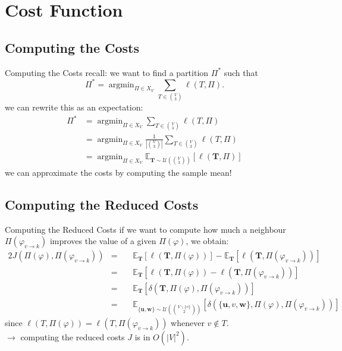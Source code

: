 \documentclass[10pt]{beamer}
\newcommand{\wf}{\mathbf{w}}
\newcommand{\uf}{\mathbf{u}}
\newcommand{\Tf}{\mathbf{T}}
\newcommand{\Uc}{\mathcal{U}}
\newcommand{\E}{\mathbb{E}}
\newcommand{\idx}{\varphi}
\newcommand{\move}[3]{#1_{#2\rightarrow #3}}
\DeclareMathOperator*{\argmin}{\arg\min}
\begin{document}
\section{Cost Function}
\subsection*{Computing the Costs}
\begin{frame}{Computing the Costs}
    recall: we want to find a partition $\Pi^*$ such that 
    $$ \Pi^* = \argmin_{\Pi \in X_V} \sum_{T \in \binom{V}{3}} \ell(T,\Pi). $$
    \pause
    we can rewrite this as an expectation:
    \begin{align*}
        \Pi^* &= \argmin_{\Pi \in X_V} \sum_{T \in \binom{V}{3}} \ell(T,\Pi) 
        \\ &= \argmin_{\Pi \in X_V} \frac{1}{|\binom{V}{3}|} \sum_{T \in \binom{V}{3}} \ell(T,\Pi)
        \\ &= \argmin_{\Pi \in X_V} \E_{\Tf \sim \Uc\left( \binom{V}{3} \right)} \left[ \ell(\Tf, \Pi) \right]
    \end{align*}
    \pause
    we can approximate the costs by computing the sample mean!
\end{frame}

\subsection*{Computing the Reduced Costs}
\begin{frame}{Computing the Reduced Costs}
    if we want to compute how much a neighbour $\Pi(\move{\idx}{v}{k})$ improves the value of a given $\Pi(\idx)$, we obtain:
    \begin{alignat*}{2}
        J( \Pi(\idx), \Pi(\move{\idx}{v}{k}) ) &= && \E_{\Tf}\left[ \ell(\Tf,\Pi(\idx)) \right] - \E_{\Tf}\left[ \ell(\Tf,\Pi(\move{\idx}{v}{k})) \right] \\ &=\ && \E_{\Tf}\left[ \ell(\Tf,\Pi(\idx)) - \ell(\Tf,\Pi(\move{\idx}{v}{k})) \right] \\ &= \ && \E_{\Tf}\left[ \delta(\Tf,\Pi(\idx),\Pi(\move{\idx}{v}{k})) \right] \\ &=\ && \E_{\{\uf,\wf\} \sim \Uc(\binom{V\backslash\{ v \}}{2})}\left[  \delta(\{\uf,v,\wf\},\Pi(\idx),\Pi(\move{\idx}{v}{k})) \right] 
    \end{alignat*}
    since $\ell(T,\Pi(\idx)) = \ell(T,\Pi(\move{\idx}{v}{k}))$ whenever $v \not\in T$.\\
    $\rightarrow$ computing the reduced costs $J$ is in $O(|V|^2)$.
\end{frame}
\end{document}

